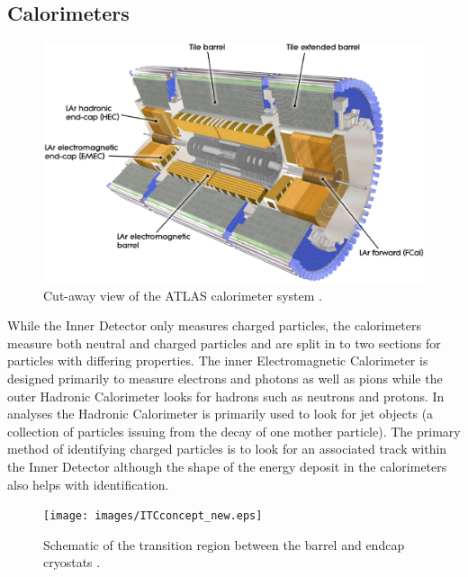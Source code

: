 	\subsection{Calorimeters}

		\begin{figure}[h]
			\begin{center}
				\includegraphics[scale=0.35]{images/Calorimeter_d3.eps}
			\end{center}
			\caption{Cut-away view of the ATLAS calorimeter system \cite{Aad:1129811}.}
			\label{fig:ATLAS_calo}
		\end{figure}

		While the Inner Detector only measures charged particles, the calorimeters measure both neutral and charged particles and are split in to two sections for particles with differing properties. The inner Electromagnetic Calorimeter is designed primarily to measure electrons and photons as well as pions while the outer Hadronic Calorimeter looks for hadrons such as neutrons and protons. In analyses the Hadronic Calorimeter is primarily used to look for jet objects (a collection of particles issuing from the decay of one mother particle). The primary method of identifying charged particles is to look for an associated track within the Inner Detector although the shape of the energy deposit in the calorimeters also helps with identification.



		\begin{figure}[h]
			\begin{center}
				\texttt{[image: images/ITCconcept\_new.eps]}
			\end{center}
			\caption{Schematic of the transition region between the barrel and endcap cryostats \cite{Aad:1129811}.}
			\label{fig:ATLAS_calo_crack}
		\end{figure}



